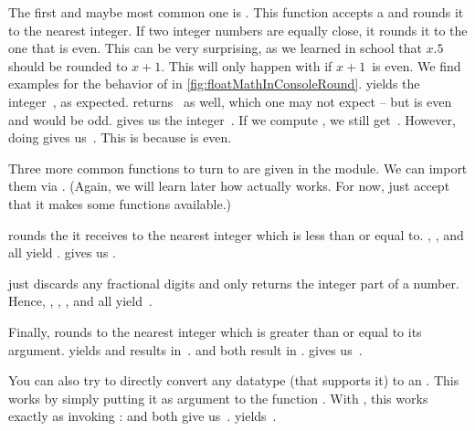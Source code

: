 The first and maybe most common one is .
This function accepts a  and rounds it to the nearest integer.
If two integer numbers are equally close, it rounds it to the one that is even.
This can be very surprising, as we learned in school that $x.5$ should be rounded to $x+1$.
This will only happen with  if $x+1$~is even.
We find examples for the behavior of  in \cref{fig:floatMathInConsoleRound}.
 yields the integer~, as expected.
 returns~ as well, which one may not expect -- but  is even and  would be odd.
 gives us the integer~.
If we compute , we still get~.
However, doing  gives us~.
This is because  is even.

Three more common functions to turn  to  are given in the  module.
We can import them via .
(Again, we will learn later how  actually works.
For now, just accept that it makes some functions available.)

 rounds the  it receives to the nearest integer which is less than or equal to.
, , and  all yield .
 gives us .

 just discards any fractional digits and only returns the integer part of a number.
Hence, , , , and  all yield~.

Finally,  rounds to the nearest integer which is greater than or equal to its argument.
 yields  and  results in~.
 and  both result in .
 gives us~.

You can also try to directly convert any datatype (that supports it) to an .
This works by simply putting it as argument to the function .
With , this works exactly as invoking :
 and  both give us~.
 yields~.

